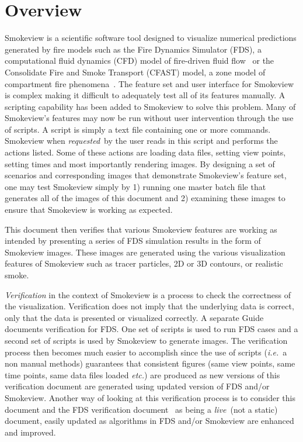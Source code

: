 \documentclass[11pt,twoside]{book}
\begin{document}
\chapter{Overview}
Smokeview is a scientific software tool designed to visualize numerical
predictions generated by fire models such as the Fire Dynamics Simulator (FDS),
a computational fluid dynamics (CFD) model of fire-driven fluid
flow~\cite{FDS_Math_Guide,FDS_Users_Guide} or the Consolidate Fire and Smoke Transport (CFAST) model, a zone model of compartment fire phenomena~\cite{Jones:2004A}.
The feature set and user interface for Smokeview is complex making it difficult to adequately test all of its features manually.  A scripting capability has been added to Smokeview to solve this problem.  Many of Smokeview's features may now be run without user intervention through the use of scripts.  A script is simply a text file containing one or more commands.  Smokeview when {\em requested}\ by the user reads in this script and performs the actions listed.  Some of these actions are loading data files, setting view points, setting times and most importantly rendering images.  By designing a set of scenarios and corresponding images that demonstrate Smokeview's feature set, one may test Smokeview simply by 1) running one master batch file that generates all of the images of this document and 2) examining these images to ensure that Smokeview is working as expected.

This document then verifies that various Smokeview features are working as intended by presenting a series of  FDS simulation results in the form of Smokeview images.  These images are generated using the various visualization features of Smokeview such as tracer particles, 2D or 3D contours, or realistic smoke.

{\em Verification} in the context of Smokeview is a process to check the correctness
of the visualization.  Verification does not imply that the underlying data is correct, only
that the data is presented or visualized correctly.
A separate Guide~\cite{FDS_Verification_Guide} documents verification for FDS.  One set of scripts is used to run FDS cases and a second set of scripts is used by Smokeview to generate images.  The verification process then becomes much easier to accomplish since the use of scripts ({\em i.e.}\ a non manual methods) guarantees that consistent figures (same view points, same time points, same data files loaded {\em etc.}) are produced as new versions of this verification document are generated using updated version of FDS and/or Smokeview.  Another way of looking at this verification process is to
consider this document and the FDS verification document~\cite{FDS_Verification_Guide} as being a {\em live}\ (not a static) document, easily updated as algorithms in FDS and/or Smokeview are enhanced and improved.
\end{document}
